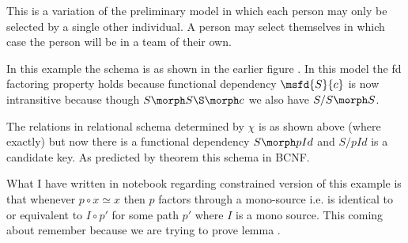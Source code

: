 
This is a variation of the preliminary model in which each person may only be selected by a single other individual.
A person may select themselves in which case the person will be in a team of their own. 

In this example the schema is as shown in the earlier figure . 
In this model the fd factoring property holds because functional dependency $\msfd{S}{c}$ is now intransitive because though
$S \morph S\S \morph c$ we also have $S/S \morph S$.

The relations in relational schema  determined by $\chi$ is as shown above (where exactly) 
but now there is a functional dependency $S \morph pId$ and $S/pId$ is a candidate key. As predicted by 
theorem  this schema in BCNF. 

What I have written in notebook regarding constrained version of this example is that
whenever $p \circ x \simeq x$ then $p$ factors through a mono-source i.e. is identical to or equivalent to 
$I \circ p'$ for some path $p'$ where $I$ is a mono source. This coming about remember because we are trying to prove lemma 
.

